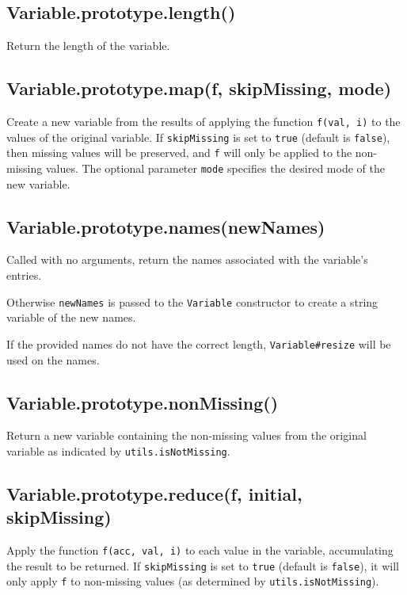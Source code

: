 \documentclass{article}
\begin{document}
    \subsection*{Variable.prototype.length()}
    Return the length of the variable.


    \subsection*{Variable.prototype.map(f, skipMissing, mode)}
    Create a new variable from the results of applying the function \texttt{f(val, i)} to the
values of the original variable. If \texttt{skipMissing} is set to \texttt{true} (default is \texttt{false}),
then missing values will be preserved, and \texttt{f} will only be applied to the non-missing
values. The optional parameter \texttt{mode} specifies the desired mode of the new variable.


    \subsection*{Variable.prototype.names(newNames)}
    Called with no arguments, return the names associated with the variable's
entries.


Otherwise \texttt{newNames} is passed to the \texttt{Variable} constructor to create a
string variable of the new names.


If the provided names do not have the correct length, \texttt{Variable\#resize}
will be used on the names.


    \subsection*{Variable.prototype.nonMissing()}
    Return a new variable containing the non-missing values from the original
variable as indicated by \texttt{utils.isNotMissing}.


    \subsection*{Variable.prototype.reduce(f, initial, skipMissing)}
    Apply the function \texttt{f(acc, val, i)} to each value in the variable, accumulating
the result to be returned.
If \texttt{skipMissing} is set to \texttt{true} (default is \texttt{false}), it will only apply
\texttt{f} to non-missing values (as determined by \texttt{utils.isNotMissing}).
\end{document}

